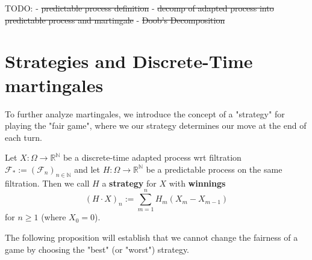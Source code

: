 TODO: 
- \st{predictable process definition}
- \st{decomp of adapted process into predictable process and martingale}
- \st{Doob's Decomposition}

\section{Strategies and Discrete-Time martingales}

To further analyze martingales, we introduce the concept of a "strategy" for playing the "fair game", where we our strategy determines our move at the end of each turn.

\begin{definition}
    \label{strategy}
    Let $X: \Omega \to \mathbb{R}^{\mathbb{N}}$ be a discrete-time adapted process wrt filtration $\mathcal{F}_{*} := (\mathcal{F}_{n})_{n \in \mathbb{N}}$ and let $H: \Omega \to \mathbb{R}^{\mathbb{N}}$ be a predictable process on the same filtration. Then we call \(H\) a \textbf{strategy} for \(X\) with \textbf{winnings} 
    \[(H \cdot X)_{n} := \sum\limits_{m=1}^{n} H_{m} (X_{m} - X_{m-1})\]
    for $n \geq 1$ (where \(X_{0} = 0\)).
\end{definition}

The following proposition will establish that we cannot change the fairness of a game by choosing the "best" (or "worst") strategy.

